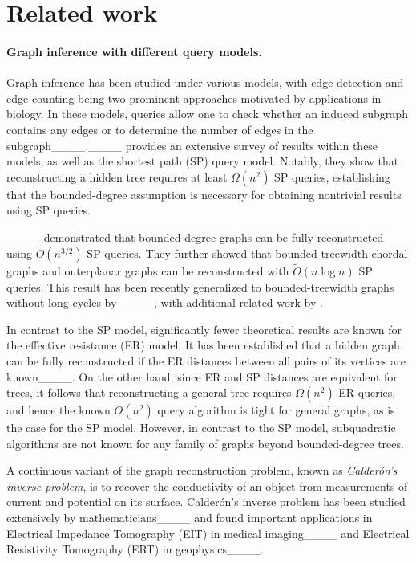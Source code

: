 \section{Related work}
\paragraph{Graph inference with different query models.}
Graph inference has been studied under various models, with {edge detection} and {edge counting} being two prominent approaches motivated by applications in biology. In these models, queries allow one to check whether an induced subgraph contains any edges or to determine the number of edges in the subgraph____.____ provides an extensive survey of results within these models, as well as the shortest path (SP) query model. Notably, they show that reconstructing a hidden tree requires at least $\Omega(n^2)$ SP queries, establishing that the bounded-degree assumption is necessary for obtaining nontrivial results using SP queries.

____
demonstrated that bounded-degree graphs can be fully reconstructed using $\widetilde{O}(n^{3/2})$ SP queries. They further showed that bounded-treewidth chordal graphs and outerplanar graphs can be reconstructed with $\widetilde{O}(n\log n)$ SP queries. This result has been recently generalized to bounded-treewidth graphs without long cycles by ____, with additional related work by \citet*{journals/tcs/RongLYW21}.

In contrast to the SP model, significantly fewer theoretical results are known for the {effective resistance (ER) model}. It has been established that a hidden graph can be fully reconstructed if the ER distances between all pairs of its vertices are known____. On the other hand, since ER and SP distances are equivalent for trees, it follows that reconstructing a general tree requires $\Omega(n^2)$ ER queries, and hence the known $O(n^2)$ query algorithm is tight for general graphs, as is the case for the SP model. However, in contrast to the SP model, subquadratic algorithms are not known for any family of graphs beyond bounded-degree trees.

A continuous variant of the graph reconstruction problem, known as \emph{Calder\'{o}n's inverse problem}, is to recover the conductivity of an object from measurements of current and potential on its surface.  Calder\'{o}n's inverse problem has been studied extensively by mathematicians____ and found important applications in Electrical Impedance Tomography (EIT) in medical imaging____ and Electrical Resistivity Tomography (ERT) in geophysics____.

